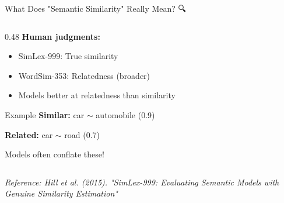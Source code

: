 \documentclass[aspectratio=169]{beamer}
\begin{document}
\begin{frame}[shrink=10]{What Does "Semantic Similarity" Really Mean? 🔍}
\begin{columns}[T]
\begin{column}{0.48\textwidth}
\vspace{1em}
\textbf{Human judgments:}
\begin{itemize}\setlength{\itemsep}{0pt}
    \item SimLex-999: True similarity
    \item WordSim-353: Relatedness (broader)
    \item Models better at relatedness than similarity
\end{itemize}

\vspace{1em}
\begin{exampleblock}{Example}
\textbf{Similar:} car $\sim$ automobile (0.9)

\textbf{Related:} car $\sim$ road (0.7)

\vspace{0.3em}
Models often conflate these!
\end{exampleblock}
\end{column}
\end{columns}

\vspace{0.5em}
\small
\textit{Reference: Hill et al. (2015). "SimLex-999: Evaluating Semantic Models with Genuine Similarity Estimation"}
\end{frame}
\end{document}
